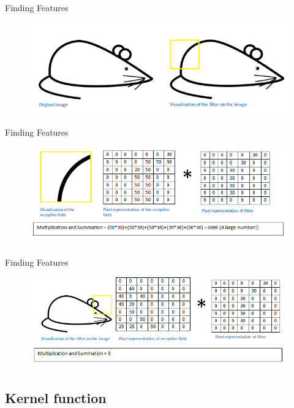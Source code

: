 \documentclass[12pt]{beamer}
\begin{document}
\begin{frame}{Finding Features}
\begin{figure}
\includegraphics[width = 0.8\linewidth]{images/mouse.png}
\label{fig:principle}
\end{figure}
\end{frame}

\begin{frame}{Finding Features}
\begin{figure}
\includegraphics[width = 0.8\linewidth]{images/mousehi.png}
\label{fig:principle}
\end{figure}
\end{frame}

\begin{frame}{Finding Features}
\begin{figure}
\includegraphics[width = 0.8\linewidth]{images/mouselo.png}
\label{fig:principle}
\end{figure}

\end{frame}

\subsection{Kernel function}
\end{document}

